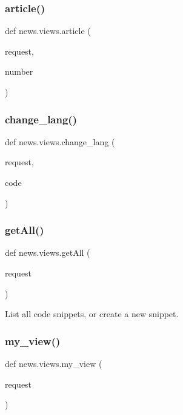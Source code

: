 \mbox{\label{namespacenews_1_1views_a8340d5eecfeb6b527e83164ebf11580b}} 
\subsubsection{\texorpdfstring{article()}{article()}}
{\footnotesize\ttfamily def news.\+views.\+article (\begin{DoxyParamCaption}\item[{}]{request,  }\item[{}]{number }\end{DoxyParamCaption})}

\mbox{\label{namespacenews_1_1views_a9f55268cd38d1b07e5d941a907d342cc}} 
\subsubsection{\texorpdfstring{change\+\_\+lang()}{change\_lang()}}
{\footnotesize\ttfamily def news.\+views.\+change\+\_\+lang (\begin{DoxyParamCaption}\item[{}]{request,  }\item[{}]{code }\end{DoxyParamCaption})}

\mbox{\label{namespacenews_1_1views_a89cc055821d1237b88ca3cf30f78f71f}} 
\subsubsection{\texorpdfstring{get\+All()}{getAll()}}
{\footnotesize\ttfamily def news.\+views.\+get\+All (\begin{DoxyParamCaption}\item[{}]{request }\end{DoxyParamCaption})}

\begin{DoxyVerb}List all code snippets, or create a new snippet.
\end{DoxyVerb}
 \mbox{\label{namespacenews_1_1views_a9b0aa87e18d6a69dace52301e34fbfff}} 
\subsubsection{\texorpdfstring{my\+\_\+view()}{my\_view()}}
{\footnotesize\ttfamily def news.\+views.\+my\+\_\+view (\begin{DoxyParamCaption}\item[{}]{request }\end{DoxyParamCaption})}


